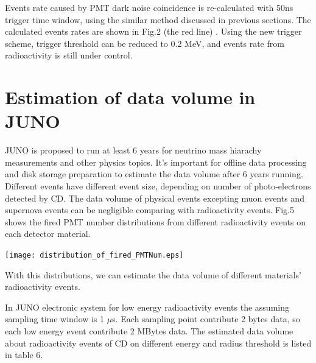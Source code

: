 \documentclass[a4paper,10pt,twoside]{paper}
\begin{document}
	\begin{multicols}{2}

		Events rate caused by PMT dark noise coincidence is re-calculated with 50ns trigger time window, 
		using the similar method discussed in previous sections. The calculated events rates are shown in Fig.2 (the red line) .
		Using the new trigger scheme, trigger threshold can be reduced to 0.2 MeV, and events rate from radioactivity is still under control.


		\section{Estimation of data volume in JUNO}
		JUNO is proposed to run at least 6 years for neutrino mass hiarachy measurements and other physics topics. 
		It's important for offline data processing and disk storage preparation to estimate the data volume after 6 years running. 
		Different events have different event size, depending on number of photo-electrons detected by CD.
		The data volume of physical events excepting muon events and supernova events can be negligible comparing with radioactivity events. 
		Fig.5  shows the fired PMT number distributions from different radioactivity events on each detector material.

		\begin{center}
			\texttt{[image: distribution\_of\_fired\_PMTNum.eps]}
		\end{center}


		With this distributions, we can estimate the data volume of different materials' radioactivity events. 

		In JUNO electronic system for low energy radioactivity events the assuming sampling time window is 1 $\mu$s. Each sampling point contribute 2 bytes data, so each low energy event contribute 2 MBytes data. The estimated data volume about radioactivity events of CD on different energy and radius threshold is listed in table 6.

	\end{multicols}
\end{document}
